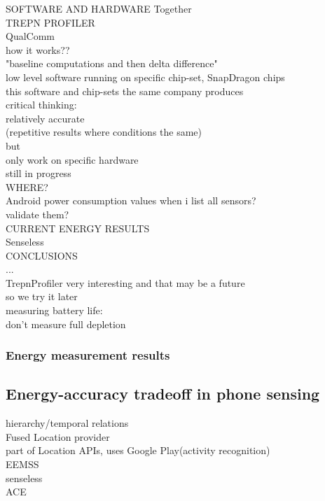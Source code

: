 SOFTWARE AND HARDWARE Together\\
	TREPN PROFILER\cite{qualcomm:trepnprofiler}\\
		QualComm\\
		how it works??\\
			"baseline computations and then delta difference"\\	
			low level software running on specific chip-set,  SnapDragon chips\\
				this software and chip-sets the same company produces\\
		critical thinking:\\
			relatively accurate\\
				(repetitive results where conditions the same)\\
			but\\
				only work on specific hardware \\
				still in progress\\
		
WHERE?\\
	Android power consumption values when i list all sensors?\\
		validate them?\\

CURRENT ENERGY RESULTS\\
	Senseless\cite{benabdesslem:senseless}\\
	

CONCLUSIONS\\
	...\\
	TrepnProfiler very interesting and that may be a future\\
		so we try it later \\
	measuring battery life:\\
		 don't measure full depletion\\

\subsubsection{Energy measurement results}
\cite{benabdesslem:senseless} \cite{constandache:localization} \cite{wang:eemss} \cite{chon:smartdc}
	
\subsection{Energy-accuracy tradeoff in phone sensing}
hierarchy/temporal relations\\
	Fused Location provider\cite{android:locationapi}\\
		part of Location APIs, uses Google Play(activity recognition)\\
	EEMSS \cite{wang:eemss}\\
	senseless \cite{benabdesslem:senseless}\\
	ACE \cite{nath:ace}\\

